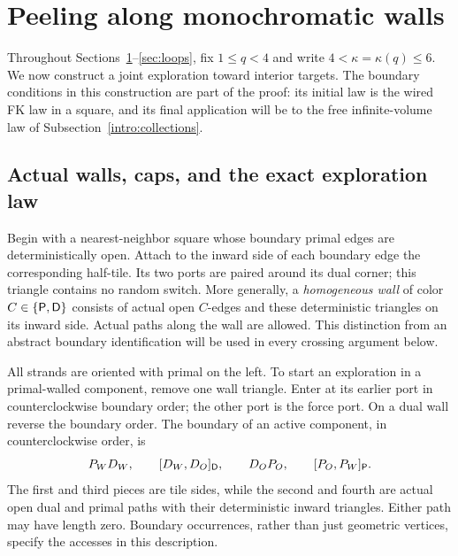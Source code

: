 \section{Peeling along monochromatic walls}
\label{sec:peeling}

Throughout Sections~\ref{sec:peeling}--\ref{sec:loops}, fix
$1\le q<4$ and write $4<\kappa=\kappa(q)\le6$.
We now construct a joint exploration toward interior targets.  The boundary
conditions in this construction are part of the proof: its initial law is
the wired FK law in a square, and its final application will be to the
free infinite-volume law of Subsection~\ref{intro:collections}.

\subsection{Actual walls, caps, and the exact exploration law}
\label{peel:construction}

Begin with a nearest-neighbor square whose boundary primal edges are
deterministically open.  Attach to the inward side of each boundary edge
the corresponding half-tile.  Its two ports are paired around its dual
corner; this triangle contains no random switch.  More generally, a
\emph{homogeneous wall} of color $C\in\{{\sf P},{\sf D}\}$ consists of
actual open $C$-edges and these deterministic triangles on its inward
side.  Actual paths along the wall are allowed.  This distinction from
an abstract boundary identification will be used in every crossing
argument below.

All strands are oriented with primal on the left.  To start an
exploration in a primal-walled component, remove one wall triangle.
Enter at its earlier port in counterclockwise boundary order; the other
port is the force port.  On a dual wall reverse the boundary order.  The
boundary of an active component, in counterclockwise order, is
\begin{equation}\label{peel:boundary}
 P_WD_W,\qquad [D_W,D_O]_{\sf D},\qquad
 D_OP_O,\qquad [P_O,P_W]_{\sf P}.
\end{equation}
The first and third pieces are tile sides, while the second and fourth
are actual open dual and primal paths with their deterministic inward
triangles.  Either path may have length zero.  Boundary occurrences,
rather than just geometric vertices, specify the accesses in this
description.

